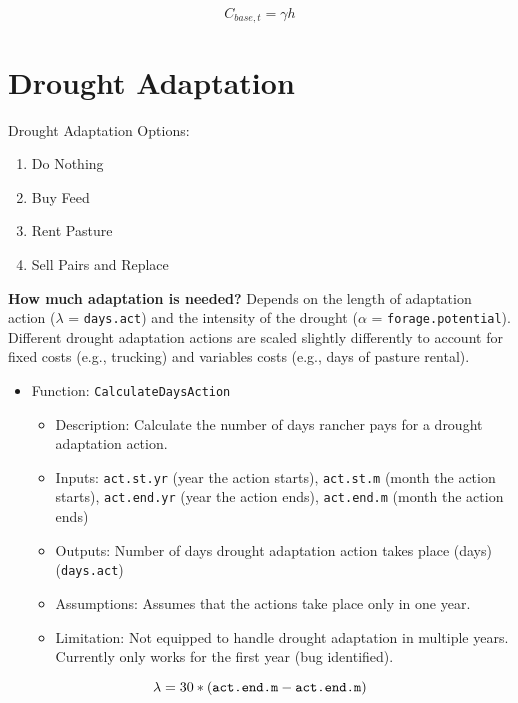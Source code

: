 \documentclass[11pt]{article}
\begin{document}
\begin{equation} \label{basecost}
C_{base,t} = \gamma h 
\end{equation}


\section{Drought Adaptation}
Drought Adaptation Options:
\begin{enumerate}
\item Do Nothing
\item Buy Feed
\item Rent Pasture
\item Sell Pairs and Replace
\end{enumerate}

\textbf{How much adaptation is needed?} 
Depends on the length of adaptation action ($\lambda$ = \verb!days.act!) and the intensity of the drought ($\alpha$ = \verb!forage.potential!). Different drought adaptation actions are scaled slightly differently to account for fixed costs (e.g., trucking) and variables costs (e.g., days of pasture rental). 

\begin{itemize}
\item Function: \verb!CalculateDaysAction!
	\begin{itemize}
	\item Description: Calculate the number of days rancher pays for a drought adaptation action. 
	\item Inputs: \verb!act.st.yr! (year the action starts), \verb!act.st.m! (month the action starts), \verb!act.end.yr! (year the action ends), \verb!act.end.m! (month the action ends)
	\item Outputs: Number of days drought adaptation action takes place (days) (\verb!days.act!)
	\item Assumptions: Assumes that the actions take place only in one year.
	\item Limitation: Not equipped to handle drought adaptation in multiple years. Currently only works for the first year (bug identified).
	\end{itemize}
\end{itemize}

\begin{equation} \label{days}
\lambda = 30 * (\verb!act.end.m! - \verb!act.end.m!)
\end{equation}
\end{document}
